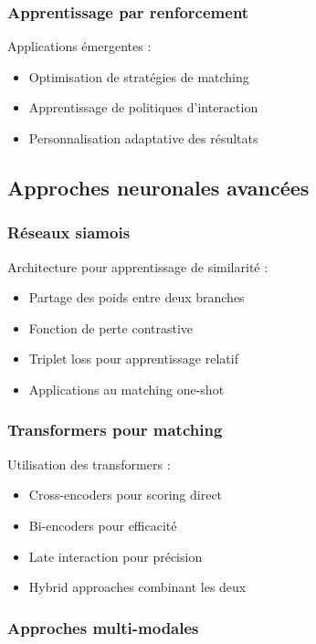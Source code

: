 \documentclass[12pt,a4paper]{report}
\begin{document}
\subsubsection{Apprentissage par renforcement}

Applications émergentes :
\begin{itemize}
\item Optimisation de stratégies de matching
\item Apprentissage de politiques d'interaction
\item Personnalisation adaptative des résultats
\end{itemize}

\subsection{Approches neuronales avancées}

\subsubsection{Réseaux siamois}

Architecture pour apprentissage de similarité :
\begin{itemize}
\item Partage des poids entre deux branches
\item Fonction de perte contrastive
\item Triplet loss pour apprentissage relatif
\item Applications au matching one-shot
\end{itemize}

\subsubsection{Transformers pour matching}

Utilisation des transformers :
\begin{itemize}
\item Cross-encoders pour scoring direct
\item Bi-encoders pour efficacité
\item Late interaction pour précision
\item Hybrid approaches combinant les deux
\end{itemize}

\subsubsection{Approches multi-modales}
\end{document}
